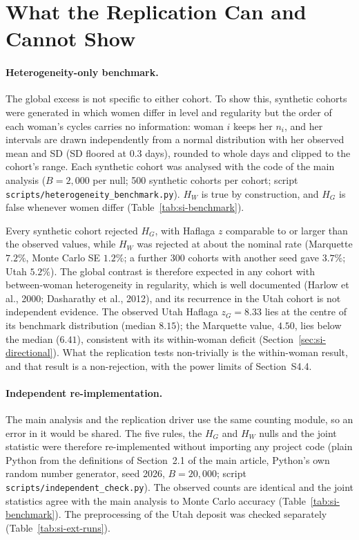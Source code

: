 \documentclass[12pt]{article}
\newcommand{\HG}{H_{G}}
\newcommand{\HW}{H_{W}}
\begin{document}
\section{What the Replication Can and Cannot Show}
\label{sec:si-benchmark}

\paragraph{Heterogeneity-only benchmark.} The global excess is not specific to either
cohort. To show this, synthetic cohorts were generated in which women differ in level and
regularity but the order of each woman's cycles carries no information: woman $i$ keeps her
$n_i$, and her intervals are drawn independently from a normal distribution with her
observed mean and SD (SD floored at 0.3 days), rounded to whole days and clipped to the
cohort's range. Each synthetic cohort was analysed with the code of the main analysis
($B = 2{,}000$ per null; 500 synthetic cohorts per cohort; script
\nolinkurl{scripts/heterogeneity_benchmark.py}). $\HW$ is true by construction, and $\HG$ is
false whenever women differ (Table~\ref{tab:si-benchmark}).

Every synthetic cohort rejected $\HG$, with Haflaga $z$ comparable to or larger than the
observed values, while $\HW$ was rejected at about the nominal rate (Marquette $7.2\%$,
Monte Carlo SE $1.2\%$; a further 300 cohorts with another seed gave $3.7\%$; Utah $5.2\%$).
The global contrast is therefore expected in any cohort with between-woman heterogeneity in
regularity, which is well documented (Harlow et al., 2000; Dasharathy et al., 2012), and its recurrence
in the Utah cohort is not independent evidence. The observed Utah Haflaga $z_G = 8.33$ lies
at the centre of its benchmark distribution (median $8.15$); the Marquette value, $4.50$,
lies below the median ($6.41$), consistent with its within-woman deficit
(Section~\ref{sec:si-directional}). What the replication tests non-trivially is the
within-woman result, and that result is a non-rejection, with the power limits of
Section~S4.4.

\paragraph{Independent re-implementation.} The main analysis and the replication driver use
the same counting module, so an error in it would be shared. The five rules, the $\HG$ and
$\HW$ nulls and the joint statistic were therefore re-implemented without importing any
project code (plain Python from the definitions of Section~2.1 of the main article,
Python's own random number generator, seed 2026, $B = 20{,}000$; script
\nolinkurl{scripts/independent_check.py}). The observed counts are identical and the joint
statistics agree with the main analysis to Monte Carlo accuracy (Table~\ref{tab:si-benchmark}).
The preprocessing of the Utah deposit was checked separately (Table~\ref{tab:si-ext-runs}).
\end{document}
